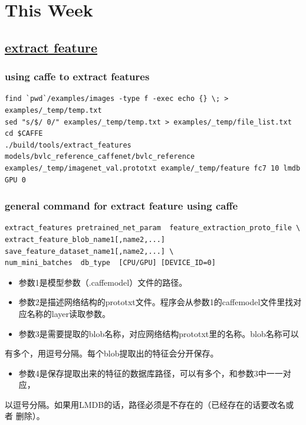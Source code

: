\documentclass[11pt]{article}
\author{章立}
\date{\today}
\title{}
\begin{document}
\tableofcontents

\section{This Week}
\label{sec:orgheadline17}
\subsection{\href{https://github.com/BVLC/caffe/tree/85bb397acfd383a676c125c75d877642d6b39ff6/examples/feature_extraction}{extract feature}}
\label{sec:orgheadline6}
\subsubsection{using caffe to extract features}
\label{sec:orgheadline1}
\begin{verbatim}
find `pwd`/examples/images -type f -exec echo {} \; > examples/_temp/temp.txt
sed "s/$/ 0/" examples/_temp/temp.txt > examples/_temp/file_list.txt
cd $CAFFE
./build/tools/extract_features models/bvlc_reference_caffenet/bvlc_reference examples/_temp/imagenet_val.prototxt example/_temp/feature fc7 10 lmdb GPU 0
\end{verbatim}
\subsubsection{general command for extract feature using caffe}
\label{sec:orgheadline2}
\begin{verbatim}
extract_features pretrained_net_param  feature_extraction_proto_file \
extract_feature_blob_name1[,name2,...]  save_feature_dataset_name1[,name2,...] \
num_mini_batches  db_type  [CPU/GPU] [DEVICE_ID=0]
\end{verbatim}
\begin{itemize}
\item 参数1是模型参数（.caffemodel）文件的路径。

\item 参数2是描述网络结构的prototxt文件。程序会从参数1的caffemodel文件里找对应名称的layer读取参数。

\item 参数3是需要提取的blob名称，对应网络结构prototxt里的名称。blob名称可以
\end{itemize}
有多个，用逗号分隔。每个blob提取出的特征会分开保存。

\begin{itemize}
\item 参数4是保存提取出来的特征的数据库路径，可以有多个，和参数3中一一对应，
\end{itemize}
以逗号分隔。如果用LMDB的话，路径必须是不存在的（已经存在的话要改名或者
删除）。 
\end{document}
